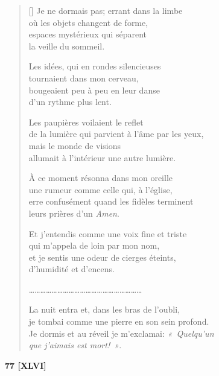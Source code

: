 \documentclass[a4paper,12pt]{book}
\begin{document}
\begin{verse}[\versewidth]
  Je ne dormais pas; errant dans la limbe \\
  où les objets changent de forme, \\
  espaces mystérieux qui séparent \\
  la veille du sommeil.

  Les idées, qui en rondes silencieuses \\
  tournaient dans mon cerveau, \\
  bougeaient peu à peu en leur danse \\
  d'un rythme plus lent.

  Les paupières voilaient le reflet \\
  de la lumière qui parvient à l'âme par les yeux, \\
  mais le monde de visions \\
  allumait à l'intérieur une autre lumière.

  À ce moment résonna dans mon oreille \\
  une rumeur comme celle qui, à l'église, \\
  erre confusément quand les fidèles terminent \\
  leurs prières d'un \emph{Amen}.

  Et j'entendis comme une voix fine et triste \\
  qui m'appela de loin par mon nom, \\
  et je sentis une odeur de cierges éteints, \\
  d'humidité et d'encens.

\ldots\ldots\ldots\ldots\ldots\ldots\ldots\ldots\ldots\ldots\ldots\ldots\ldots\ldots\ldots\ldots\ldots\ldots\ldots\ldots

  La nuit entra et, dans les bras de l'oubli, \\
  je tombai comme une pierre en son sein profond. \\
  Je dormis et au réveil je m'exclamai: \emph{«~Quelqu'un \\
que j'aimais est mort!~»}.
\end{verse}

\bigskip

\begin{center}
  \textbf{77 [XLVI]}
\end{center}

\settowidth{\versewidth}{Elle m'a blessé en se retirant dans l'ombre,}
\end{document}

